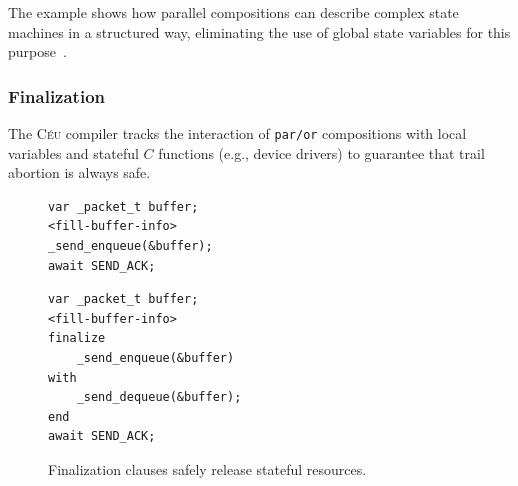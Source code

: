 \documentclass{acm_proc_article-sp}
\newcommand{\CEU}{\textsc{C\'{e}u}\xspace}
\newcommand{\code}[1] {{\small{\texttt{#1}}}}
\newcommand{\1}{\;}
\newcommand{\2}{\;\;}
\newcommand{\3}{\;\;\;}
\newcommand{\5}{\;\;\;\;\;}
\begin{document}
The example shows how parallel compositions can describe complex state machines 
in a structured way, eliminating the use of global state variables for this 
purpose~\cite{ceu.sensys13}.

\subsubsection{Finalization}

%
The \CEU compiler tracks the interaction of \code{par/or} compositions with 
local variables and stateful $C$ functions (e.g., device drivers) to guarantee 
that trail abortion is always safe.

\begin{figure}[t]
\begin{minipage}[t]{0.45\linewidth}
\begin{lstlisting}
var _packet_t buffer;
<fill-buffer-info>
_send_enqueue(&buffer);
await SEND_ACK;
\end{lstlisting}
\end{minipage}
%
\begin{minipage}[t]{0.50\linewidth}
\begin{lstlisting}
var _packet_t buffer;
<fill-buffer-info>
finalize
    _send_enqueue(&buffer)
with
    _send_dequeue(&buffer);
end
await SEND_ACK;
\end{lstlisting}
\end{minipage}
\caption{ Finalization clauses safely release stateful resources.
\label{lst.fin}
}
\end{figure}
\end{document}
